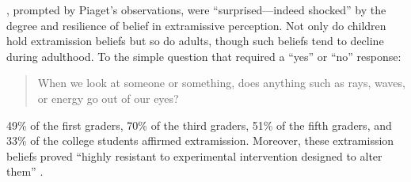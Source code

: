 
\citet[138]{Winer:1996as}, prompted by Piaget's observations, were ``sur\-pri\-sed---indeed shocked'' by the degree and resilience of belief in extramissive perception. Not only do children hold extramission beliefs but so do adults, though such beliefs tend to decline during adulthood. To the simple question that required a ``yes'' or ``no'' response:
\begin{quote}
	When we look at someone or something, does anything such as rays, waves, or energy go out of our eyes?
\end{quote}
49\% of the first graders, 70\% of the third graders, 51\% of the fifth graders, and 33\% of the college students affirmed extramission. Moreover, these extramission beliefs proved ``highly resistant to experimental intervention designed to alter them'' \citep[138]{Winer:1996as}. 

